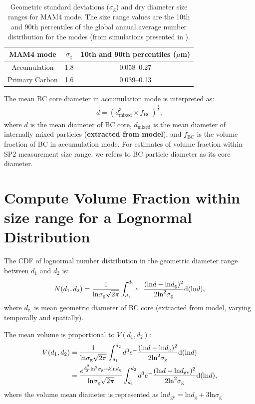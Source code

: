 \documentclass[11pt]{article}
\begin{document}
\begin{table}
	\begin{center}
		\begin{tabular}{c c c}
			\hline  
			MAM4 mode & $\sigma_{\text{g}}$ &  10th and 90th percentiles ($\mu$m)		\\   \hline
			Accumulation  & 1.8  &   0.058--0.27 		\\ \hline
			Primary Carbon   & 1.6  &  0.039--0.13  		\\
			\hline			
		\end{tabular}
	\end{center}
\caption{\label{tab:ozone} Geometric standard deviations ($\sigma_{\text{g}}$) and dry diameter size ranges for MAM4 mode. The size range values are the 10th and 90th percentiles of the global annual average number distribution for the modes (from simulations presented in \citet{Liu2012}).\label{tab:mam4_modes}}
\end{table}


\bigskip
\noindent The mean BC core diameter in accumulation mode is interpreted as:
\begin{align*}
d = (d_{\text{mixed}}^3 \times f_{\text{BC}})^\frac{1}{3}, 
\end{align*}
where $d$ is the mean diameter of BC core,
$d_{\text{mixed}}$ is the mean diameter of internally mixed particles
(\textbf{extracted from model}), and $f_{\text{BC}}$ is the volume
fraction of BC in accumulation mode. For estimates of volume fraction within SP2 measurement size range, we refers to BC particle diameter as its core diameter.

\section{Compute Volume Fraction within size range for a Lognormal Distribution}
The CDF of lognormal number distribution in the geometric diameter range between $d_{1}$ and
$d_{2}$ is:
\begin{align*}
N(d_{1}, d_{2}) = \frac{1}{\text{ln}\sigma_{\text{g}}\sqrt{2\pi}}\int_{d_{1}}^{d_{2}}e^-\frac{(\text{ln}d - \text{ln}d_{\rm g})^2}{2\text{ln}^2\sigma_{\text{g}}}\text{d}(\text{ln}d),
\end{align*}
where $d_{\rm g}$ is mean geometric diameter of BC core (extracted from model, varying temporally and spatially). 

\noindent The mean volume is proportional to $V(d_{1}, d_{2})$:
\begin{align*}
V(d_{1}, d_{2}) &= \frac{1}{\text{ln}\sigma_{\text{g}}\sqrt{2\pi}}\int_{d_{1}}^{d_{2}}d^3e^-\frac{(\text{ln}d - \text{ln}d_{\rm g})^2}{2\text{ln}^2\sigma_{\text{g}}}\text{d}(\text{ln}d)  \\
&=\frac{e^{\frac{k^2}{2}\text{ln}^2\sigma_{\rm g}+k\text{ln}d_{\rm g}}}{\text{ln}\sigma_{\text{g}}\sqrt{2\pi}}\int_{d_{1}}^{d_{2}}d^3e^-\frac{(\text{ln}d - \text{ln}d_{\text{gv}})^2}{2\text{ln}^2\sigma_{\text{g}}}\text{d}(\text{ln}d),
\end{align*}
where the volume mean diameter is represented as $\text{ln}d_{\text{gv}}
= \text{ln}d_{\text{g}} + 3\text{ln}\sigma_{\text{g}}$
\end{document}
